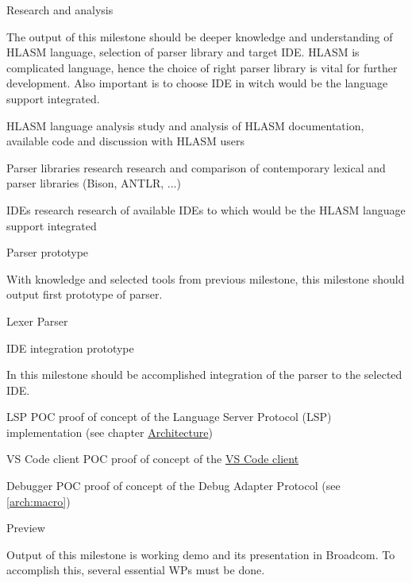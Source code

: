 










\iffalse

\bms
\itemm Research and analysis 

\small The output of this milestone should be deeper knowledge and understanding of HLASM language, selection of parser library and target IDE.
HLASM is complicated language, hence the choice of right parser library is vital for further development. Also important is to choose IDE in witch would be the language support integrated.

\bwp
\itemwp HLASM language analysis 
\tiny study and analysis of HLASM documentation, available code and discussion with HLASM users

\itemwp Parser libraries research 
\tiny research and comparison of contemporary lexical and parser libraries (Bison, ANTLR, ...) 

\itemwp IDEs research 
\tiny research of available IDEs to which would be the HLASM language support integrated
\eenum


\itemm Parser prototype 

\small With knowledge and selected tools from previous milestone, this milestone should output first prototype of parser.

\bwp
\itemwp Lexer 
\itemwp Parser 
\eenum


\itemm IDE integration prototype 

\small In this milestone should be accomplished integration of the parser to the selected IDE.

\bwp
\itemwp LSP POC 
\tiny proof of concept of the Language Server Protocol (LSP) implementation (see chapter \hyperref[arch]{Architecture})

\itemwp VS Code client POC 
\tiny proof of concept of the \hyperref[arch:client]{VS Code client}

\itemwp Debugger POC 
\tiny proof of concept of the Debug Adapter Protocol (see \ref{arch:macro})
\eenum





\itemm \label{milestone_preview} Preview 

\small Output of this milestone is working demo and its presentation in Broadcom. To accomplish this, several essential WPs must be done.

